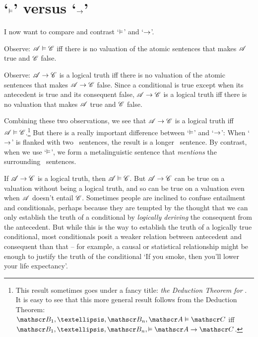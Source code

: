 \section{`$\vDash$' versus `$\rightarrow$'}
I now want to compare and contrast `$\vDash$' and `$\rightarrow$'. 

Observe: $\mathscr{A} \vDash \mathscr{C}$ iff there is no valuation of the atomic sentences that makes $\mathscr{A}$ true and $\mathscr{C}$ false. 

Observe: $\mathscr{A} \rightarrow \mathscr{C}$ is a logical truth iff there is no valuation of the atomic sentences that makes $\mathscr{A} \rightarrow \mathscr{C}$ false. Since a conditional is true except when its antecedent is true and its consequent false, $\mathscr{A} \rightarrow \mathscr{C}$ is a logical truth iff there is no valuation that makes $\mathscr{A}$ true and $\mathscr{C}$ false. 

Combining these two observations, we see that $\mathscr{A} \rightarrow \mathscr{C}$  is a logical truth iff  $\mathscr{A} \vDash \mathscr{C}$\label{ded.thm}.\footnote{This result sometimes goes under a fancy title: \emph{the Deduction Theorem for \TFL}. It is easy to see that this more general result follows from the Deduction Theorem: $\meta{B}_{1},…,\meta{B}_{n},\meta{A}\entails \meta{C}$ iff $\meta{B}_{1},…,\meta{B}_{n},\entails \meta{A}\eif\meta{C}$.} But there is a really important difference between `$\vDash$' and `$\rightarrow$':
When `$\rightarrow$' is flanked with two \TFL\ sentences, the result is a longer \TFL\ sentence. By contrast, when we use `$\vDash$', we form a metalinguistic sentence that \emph{mentions} the surrounding \TFL\ sentences. 

If $\mathscr{A}\rightarrow\mathscr{C}$ is a logical truth, then $\mathscr{A}\vDash\mathscr{C}$. But $\mathscr{A}\rightarrow\mathscr{C}$ can be true on a valuation without being a logical truth, and so can be true on a valuation even when $\mathscr{A}$ doesn't entail $\mathscr{C}$. Sometimes people are inclined to confuse entailment and conditionals, perhaps because they are tempted by the thought that we can only establish the truth of a conditional by \emph{logically deriving} the consequent from the antecedent. But while this is the way to establish the truth of a logically true conditional, most conditionals posit a weaker relation between antecedent and consequent than that – for example, a causal or statistical relationship might be enough to justify the truth of the conditional `If you smoke, then you'll lower your life expectancy'.

